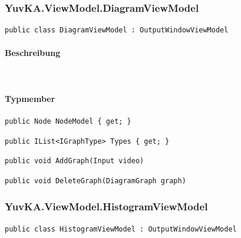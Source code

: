 \subsubsection{YuvKA.ViewModel.DiagramViewModel}

\begin{verbatim}
public class DiagramViewModel : OutputWindowViewModel
\end{verbatim}

\paragraph{Beschreibung}~\\

\paragraph{Typmember}
\begin{itemize}

	\begin{verbatim}
public Node NodeModel { get; }
	\end{verbatim}

	\begin{verbatim}
public IList<IGraphType> Types { get; }
	\end{verbatim}


	\begin{verbatim}
public void AddGraph(Input video)
	\end{verbatim}

	\begin{verbatim}
public void DeleteGraph(DiagramGraph graph)
	\end{verbatim}


\end{itemize}

\subsubsection{YuvKA.ViewModel.HistogramViewModel}

\begin{verbatim}
public class HistogramViewModel : OutputWindowViewModel
\end{verbatim}


